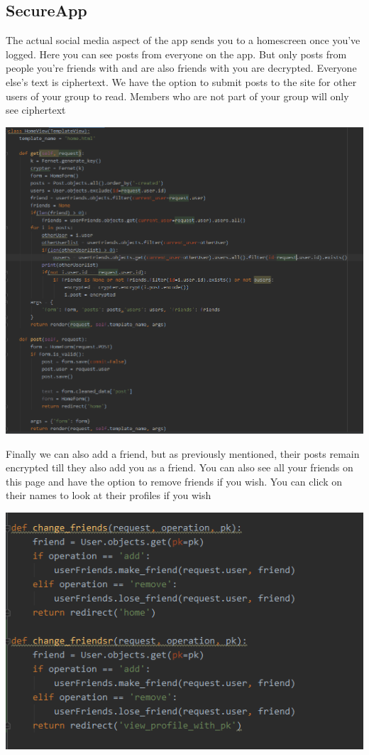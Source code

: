 \documentclass[11pt]{article} %
\begin{document}
\subsection{SecureApp}
The actual social media aspect of the app sends you to a homescreen once you've logged. Here you can see posts from everyone on the app. But only posts from people you're friends with and are also friends with you are decrypted. Everyone else's text is ciphertext. 
\newline
We have the option to submit posts to the site for other users of your group to read. Members who are not part of your group will only see ciphertext
\begin{center}
\includegraphics[scale = 0.6]{home.png}
\end{center}
Finally we can also add a friend, but as previously mentioned, their posts remain encrypted till they also add you as a friend.
You can also see all your friends on this page and have the option to remove friends if you wish. You can click on their names to look at their profiles if you wish
\begin{center}
\includegraphics{frnds.png}
\end{center}
\end{document}
